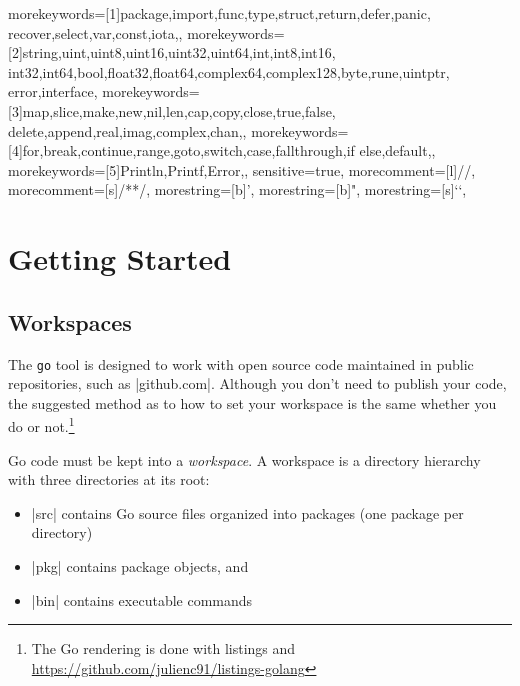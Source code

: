 \def\Go{\texttt{go}\xspace}

%
  {morekeywords=[1]{package,import,func,type,struct,return,defer,panic,%
     recover,select,var,const,iota,},%
   morekeywords=[2]{string,uint,uint8,uint16,uint32,uint64,int,int8,int16,%
     int32,int64,bool,float32,float64,complex64,complex128,byte,rune,uintptr,%
     error,interface},%
   morekeywords=[3]{map,slice,make,new,nil,len,cap,copy,close,true,false,%
     delete,append,real,imag,complex,chan,},%
   morekeywords=[4]{for,break,continue,range,goto,switch,case,fallthrough,if%
     else,default,},%
   morekeywords=[5]{Println,Printf,Error,},%
   sensitive=true,%
   morecomment=[l]{//},%
   morecomment=[s]{/*}{*/},%
   morestring=[b]',%
   morestring=[b]",%
   morestring=[s]{`}{`},%
   }
   
   
\chapter{Getting Started}

\section{Workspaces}

The \Go tool is designed to work with open source code maintained in public repositories,
such as |github.com|. Although you don't need to publish your code, the suggested method
as to how to set your workspace is the same whether you do or not.\footnote{The Go rendering is done with listings and \protect\url{https://github.com/julienc91/listings-golang}}

Go code must be kept into a \emph{workspace}. A workspace is a directory hierarchy with
three directories at its root:

\begin{itemize}
\item |src| contains Go source files organized into packages (one package per directory)
\item |pkg| contains package objects, and
\item |bin| contains executable commands
\end{itemize}

